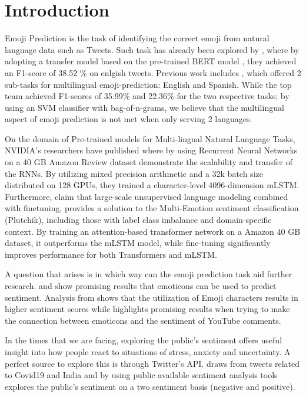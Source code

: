 \documentclass[11pt]{article}
\begin{document}
\section{Introduction}
\label{sec:intro}

Emoji Prediction is the task of identifying the correct emoji from natural language data such as Tweets. Such task has already been explored by \cite{Zhang2019}, where by adopting a transfer model based on the pre-trained BERT model \cite{devlin2018bert}, they achieved an F1-score of 38.52 \% on enlgish tweets. Previous work includes \cite{barbieri-etal-2018-semeval}, which offered 2 sub-tasks for multilingual emoji-prediction: English and Spanish. While the top team \cite{coltekin-etal-2018-tubingen} achieved F1-scores of 35.99\% and 22.36\% for the two respective tasks; by using an SVM classifier with bag-of-n-grams, we believe that the multilingual aspect of emoji prediction is not met when only serving 2 languages.


On the domain of Pre-trained models for Multi-lingual Natural Language Tasks, NVIDIA's researchers have published
\cite{puri2018large} where by using Recurrent Neural Networks on a 40 GB Amazon Review dataset demonstrate 
the scalability and transfer of the RNNs. By utilizing mixed precision arithmetic and 
a 32k batch size distributed on 128 GPUs, they trained a character-level 4096-dimension mLSTM.
Furthermore, \cite{kant2018practical} claim that large-scale unsupervised language modeling combined 
with finetuning, provides a solution to the Multi-Emotion sentiment classification (Plutchik),
including those with label class imbalance and domain-specific context. By training an attention-based
transformer network on a Amazon 40 GB dataset, it outperforms the mLSTM model, while fine-tuning significantly 
improves performance for both Transformers and mLSTM.

A question that arises is in which way can the emoji prediction task aid further research. \cite{cates2018} and \cite{avyaz2017}  show promising results that emoticons can be used to predict sentiment. Analysis from \cite{avyaz2017} shows that the utilization of Emoji characters results in higher sentiment scores while \cite{cates2018} highlights promising results when trying to make the connection between emoticons and the sentiment of YouTube comments.  

In the times that we are facing, exploring the public's sentiment offers useful insight into how people react to situations of stress, anxiety and uncertainty. A perfect source to explore this is through Twitter's API.\cite{subasish2020} draws from tweets related to Covid19 and India and by using public available sentiment analysis tools explores the public's sentiment on a two sentiment basis (negative and positive). 
    
\end{document}
